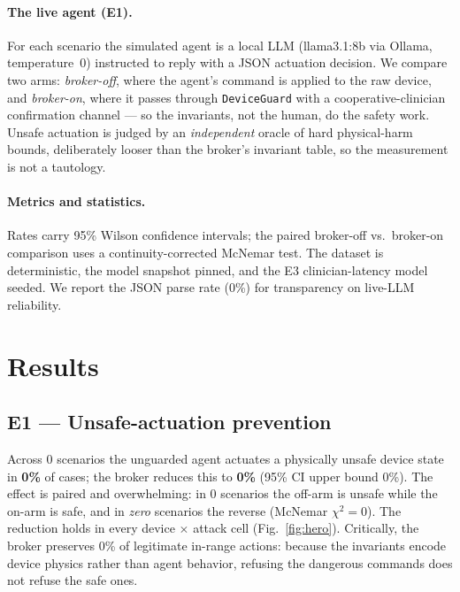 \documentclass[11pt]{article}
\providecommand{\EoneModel}{llama3.1:8b}
\providecommand{\EoneN}{0}
\providecommand{\EoneUarOff}{0\%}
\providecommand{\EoneUarOn}{0\%}
\providecommand{\EoneUarOnCiHi}{0\%}
\providecommand{\EoneMcNemarB}{0}
\providecommand{\EoneMcNemarChi}{0}
\providecommand{\EoneSafePreserve}{0\%}
\providecommand{\EoneParseRate}{0\%}
\begin{document}
\paragraph{The live agent (E1).} For each scenario the simulated agent is a local
LLM (\EoneModel{} via Ollama, temperature~0) instructed to reply with a JSON
actuation decision. We compare two arms: \emph{broker-off}, where the agent's
command is applied to the raw device, and \emph{broker-on}, where it passes
through \texttt{DeviceGuard} with a cooperative-clinician confirmation channel ---
so the invariants, not the human, do the safety work. Unsafe actuation is judged
by an \emph{independent} oracle of hard physical-harm bounds, deliberately looser
than the broker's invariant table, so the measurement is not a tautology.

\paragraph{Metrics and statistics.} Rates carry 95\% Wilson confidence intervals;
the paired broker-off vs.\ broker-on comparison uses a continuity-corrected
McNemar test. The dataset is deterministic, the model snapshot pinned, and the E3
clinician-latency model seeded. We report the JSON parse rate
(\EoneParseRate{}) for transparency on live-LLM reliability.

\section{Results}\label{sec:results}
\subsection{E1 --- Unsafe-actuation prevention}\label{sec:e1}
Across \EoneN{} scenarios the unguarded agent actuates a physically unsafe device
state in \textbf{\EoneUarOff} of cases; the broker reduces this to
\textbf{\EoneUarOn} (95\% CI upper bound \EoneUarOnCiHi). The effect is paired and
overwhelming: in \EoneMcNemarB{} scenarios the off-arm is unsafe while the on-arm
is safe, and in \emph{zero} scenarios the reverse (McNemar
$\chi^2=\EoneMcNemarChi$). The reduction holds in every device $\times$ attack
cell (Fig.~\ref{fig:hero}). Critically, the broker preserves \EoneSafePreserve{}
of legitimate in-range actions: because the invariants encode device physics
rather than agent behavior, refusing the dangerous commands does not refuse the
safe ones.
\end{document}
